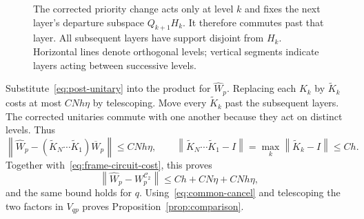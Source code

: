 \documentclass[11pt]{article}
\numberwithin{equation}{section}
\theoremstyle{definition}
\theoremstyle{remark}
\newcommand{\norm}[1]{\left\lVert#1\right\rVert}
\newcommand{\cC}{\mathcal C}
\begin{document}
\begin{figure}[t]
\centering
{}
\caption{The corrected priority change acts only at level $k$ and fixes
the next layer's departure subspace $Q_{k+1}H_k$. It therefore commutes past
that layer. All subsequent layers have support disjoint from $H_k$. Horizontal
lines denote orthogonal levels; vertical segments indicate layers acting
between successive levels.}
\label{fig:priority}
\end{figure}

Substitute~\eqref{eq:post-unitary} into the product for $\widehat W_p$.
Replacing each $K_k$ by $\widetilde K_k$ costs at most $CNh\eta$ by
telescoping. Move every $\widetilde K_k$ past the subsequent layers.
The corrected unitaries commute with one another because they act on
distinct levels. Thus
\begin{equation}\label{eq:moved-errors}
 \norm{\widehat W_p-
    (\widetilde K_N\cdots\widetilde K_1)\overline W_p}
 \le CNh\eta,
 \qquad
 \norm{\widetilde K_N\cdots\widetilde K_1-I}
 =\max_k\norm{\widetilde K_k-I}\le Ch.
\end{equation}
Together with~\eqref{eq:frame-circuit-cost}, this proves
\[
 \norm{\widehat W_p-W_p^{\cC_2}}\le Ch+CN\eta+CNh\eta,
\]
and the same bound holds for $q$. Using~\eqref{eq:common-cancel} and
telescoping the two factors in $V_{qp}$ proves
Proposition~\ref{prop:comparison}.
\end{document}
